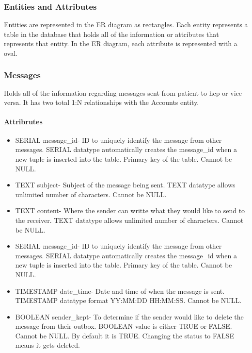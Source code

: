 \documentclass[12pt]{report}
\begin{document}
\subsubsection{Entities and Attributes}
Entities are represented in the ER diagram as rectangles.  Each entity represents a table in the database that holds all of the information or attributes that represents that entity.  In the ER diagram, each attribute is represented with a oval.

\subsubsection{Messages}
Holds all of the information regarding messages sent from patient to hcp or vice versa. It has two total 1:N relationships with the Accounts entity.\\
\paragraph{Attribrutes}
\begin{itemize}
\item SERIAL message\_id- ID to uniquely identify the message from other messages. SERIAL datatype automatically creates the message\_id when a new tuple is inserted into the table.  Primary key of the table.  Cannot be NULL.
\item TEXT subject- Subject of the message being sent. TEXT datatype allows unlimited number of characters.  Cannot be NULL.
\item TEXT content- Where the sender can writte what they would like to send to the receiver.  TEXT datatype allows unlimited number of characters.  Cannot be NULL.
\item SERIAL message\_id- ID to uniquely identify the message from other messages. SERIAL datatype automatically creates the message\_id when a new tuple is inserted into the table.  Primary key of the table.  Cannot be NULL.
\item TIMESTAMP date\_time- Date and time of when the message is sent.  TIMESTAMP datatype format YY:MM:DD HH:MM:SS.  Cannot be NULL.
\item BOOLEAN sender\_kept- To determine if the sender would like to delete the message from their outbox.  BOOLEAN value is either TRUE or FALSE.  Cannot be NULL.  By default it is TRUE.  Changing the status to FALSE means it gets deleted.


\end{itemize}
\end{document}
